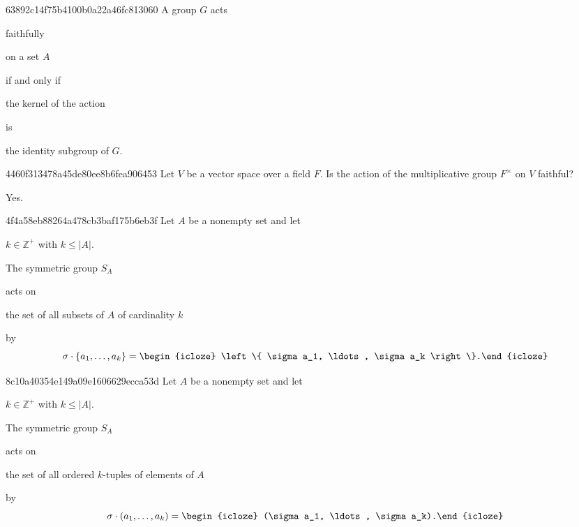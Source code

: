 \begin{note}{63892c14f75b4100b0a22a46fc813060}
    A group \({ G }\) acts \begin{icloze}{3}faithfully\end{icloze} on a set \({ A }\) \begin{icloze}{4}if and only if\end{icloze} \begin{icloze}{2}the kernel of the action\end{icloze} is \begin{icloze}{1}the identity subgroup of \({ G }\).\end{icloze}
\end{note}

\begin{note}{4460f313478a45de80ee8b6fea906453}
    Let \({ V }\) be a vector space over a field \({ F }\).
    Is the action of the multiplicative group \({ F^{\times} }\) on \({ V }\) faithful?

    \begin{cloze}{1}
        Yes.
    \end{cloze}
\end{note}

\begin{note}{4f4a58eb88264a478cb3baf175b6eb3f}
    Let \({ A }\) be a nonempty set and let \begin{icloze}{4}\({ k \in \mathbb Z^{+} }\) with \({ k \leq \left\lvert A \right\rvert }\).\end{icloze}
    \begin{icloze}{3}The symmetric group \({ S_{A} }\)\end{icloze} acts on \begin{icloze}{2}the set of all subsets of \({ A }\) of cardinality \({ k }\)\end{icloze} by
    \[
        \sigma \cdot \left\{ a_1, \ldots, a_k \right\} = \begin{icloze}{1}\left\{ \sigma a_1, \ldots, \sigma a_k \right\}.\end{icloze}
    \]
\end{note}

\begin{note}{8c10a40354e149a09e1606629ecca53d}
    Let \({ A }\) be a nonempty set and let \begin{icloze}{4}\({ k \in \mathbb Z^{+} }\) with \({ k \leq \left\lvert A \right\rvert }\).\end{icloze}
    \begin{icloze}{3}The symmetric group \({ S_{A} }\)\end{icloze} acts on \begin{icloze}{2}the set of all ordered \({ k }\)-tuples of elements of \({ A }\)\end{icloze} by
    \[
        \sigma \cdot (a_1, \ldots, a_k) = \begin{icloze}{1}(\sigma a_1, \ldots, \sigma a_k).\end{icloze}
    \]
\end{note}


